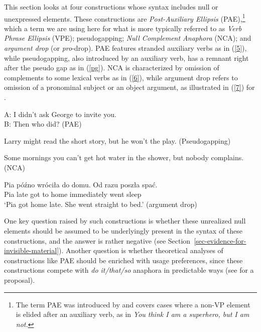 This section looks at four constructions whose syntax includes null or unexpressed elements. These
constructions are \emph{Post-Auxiliary Ellipsis} (PAE),\footnote{The term PAE was introduced by
  \citet{Sag1976} and covers cases where a non-VP element is elided after an auxiliary verb, as in \emph{You think
  I am a superhero, but I am not.}%
} 
which a term we are using here for what is more typically referred to as \emph{Verb Phrase Ellipsis}
(VPE); pseudogapping; \emph{Null Complement Anaphora} (NCA); and \emph{argument drop} (or
\emph{pro}-drop). PAE features stranded auxiliary verbs as in (\ref{5}), while pseudogapping, also
introduced by an auxiliary verb, has a remnant right after the pseudo gap as in (\ref{pg}). 
%
%
%
%
 NCA is characterized by omission of complements to some lexical verbs as in (\ref{6}), while argument drop refers to omission of a pronominal subject or an object argument, as illustrated in (\ref{7}) for .

\ea A: I didn't ask George to invite you.\\B: Then who did? (PAE) \label{5}\z

\ea 
Larry might read the short story, but he won't the play.
(Pseudogapping) \label{pg}\z

\ea Some mornings you can't get hot water in the shower, but nobody complains. (NCA) \label{6} \z

\ea
\gll Pia p\'{o}\'{z}no wr\'{o}ci\l a do domu. {Od razu} posz\l a spa\'{c}.\\
Pia late got to home immediately went sleep\\
\glt `Pia got home late. She went straight to bed.'
(argument drop) \label{7}
\z
%

\begin{sloppypar}
One key question raised by such constructions
 is whether these unrealized null elements should be assumed to be underlyingly present in the syntax of these constructions, and the answer is rather negative (see Section~\ref{sec-evidence-for-invisible-material}). Another question is whether theoretical analyses of constructions like PAE should be enriched with usage preferences, since these constructions compete with \textit{do it/that/so} anaphora in predictable ways (see \citealt{Miller2013a} for a proposal).
\end{sloppypar}

